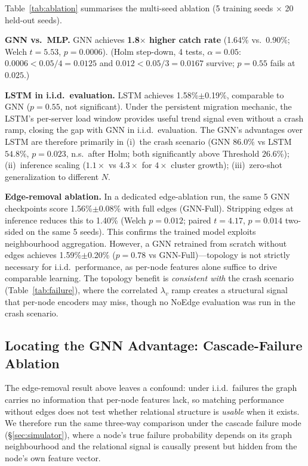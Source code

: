 \documentclass[review,1p]{elsarticle}
\theoremstyle{definition}
\begin{document}
Table~\ref{tab:ablation} summarises the multi-seed ablation (5 training seeds $\times$ 20 held-out seeds).

\textbf{GNN vs.\ MLP.}
GNN achieves \textbf{1.8$\times$ higher catch rate} (1.64\% vs.\ 0.90\%;
Welch $t{=}5.53$, $p{=}0.0006$).
(Holm step-down, 4 tests, $\alpha{=}0.05$: $0.0006 < 0.05/4{=}0.0125$
and $0.012 < 0.05/3{=}0.0167$ survive; $p{=}0.55$ fails at $0.025$.)

\textbf{LSTM in i.i.d.\ evaluation.}
LSTM achieves 1.58\%$\pm$0.19\%, comparable to GNN ($p{=}0.55$, not significant).
Under the persistent migration mechanic, the LSTM's per-server load window
provides useful trend signal even without a crash ramp, closing the gap with
GNN in i.i.d.\ evaluation.
The GNN's advantages over LSTM are therefore primarily in
(i)~the crash scenario (GNN $86.0\%$ vs LSTM $54.8\%$, $p{=}0.023$, n.s.\ after Holm; both significantly above Threshold $26.6\%$);
(ii)~inference scaling ($1.1\times$ vs $4.3\times$ for $4\times$ cluster growth);
(iii)~zero-shot generalization to different $N$.

\textbf{Edge-removal ablation.}
In a dedicated edge-ablation run, the same 5 GNN checkpoints score
1.56\%$\pm$0.08\% with full edges (GNN-Full).
Stripping edges at inference reduces this to 1.40\% (Welch $p{=}0.012$;
paired $t{=}4.17$, $p{=}0.014$ two-sided on the same 5 seeds).
This confirms the trained model exploits
neighbourhood aggregation.  However, a GNN retrained from scratch without
edges achieves 1.59\%$\pm$0.20\% ($p{=}0.78$ vs GNN-Full)---topology is
not strictly necessary for i.i.d.\ performance, as per-node features alone
suffice to drive comparable learning.  The topology benefit is \emph{consistent
with} the crash scenario (Table~\ref{tab:failure}), where the correlated
$\lambda_v$ ramp creates a structural signal that per-node encoders may
miss, though no NoEdge evaluation was run in the crash scenario.

\subsection{Locating the GNN Advantage: Cascade-Failure Ablation}
\label{sec:cascade_ablation}

The edge-removal result above leaves a confound: under i.i.d.\ failures
the graph carries no information that per-node features lack, so matching
performance without edges does not test whether relational structure is
\emph{usable} when it exists.  We therefore run the same three-way
comparison under the cascade failure mode (\S\ref{sec:simulator}), where
a node's true failure probability depends on its graph neighbourhood and
the relational signal is causally present but hidden from the node's own
feature vector.
\end{document}
